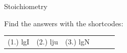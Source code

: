 \begin{exercises}{  Stoichiometry
      }
\begin{enumerate}[noitemsep, label=\textbf{\arabic*}. ]
\begin{enumerate}[noitemsep, label=\textbf{\alph*}. ]
\end{enumerate}
                \end{enumerate}
\practiceinfo
\par {} Find the answers with the shortcodes:
 \par \begin{tabular}[h]{cccccc}
 (1.) lgI  &  (2.) lju  &  (3.) lgN  & \end{tabular}
\end{exercises}


